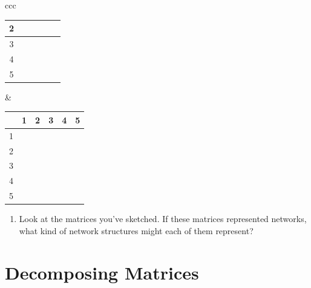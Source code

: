 \documentclass[a4paper, 14pt]{extarticle}
\begin{document}
\begin{enumerate}
\begin{center}
\begin{tabular}{ccc}
\begin{tabular}{|c|c|c|c|c|c|}
        2 & & & & & \\
        \hline
        3 & & & & & \\
        \hline
        4 & & & & & \\
        \hline
        5 & & & & & \\
        \hline
        \end{tabular}
        &
        \begin{tabular}{|c|c|c|c|c|c|}
        \hline
        & 1 & 2 & 3 & 4 & 5 \\
        \hline
        1 & & & & & \\
        \hline
        2 & & & & & \\
        \hline
        3 & & & & & \\
        \hline
        4 & & & & & \\
        \hline
        5 & & & & & \\
        \hline
        \end{tabular}
    \end{tabular}
    \end{center}
\end{enumerate}

\begin{enumerate}[resume]
    \item Look at the matrices you've sketched. If these matrices represented networks, what kind of network structures might each of them represent?
\end{enumerate}

\clearpage
\section{Decomposing Matrices}
\end{document}
